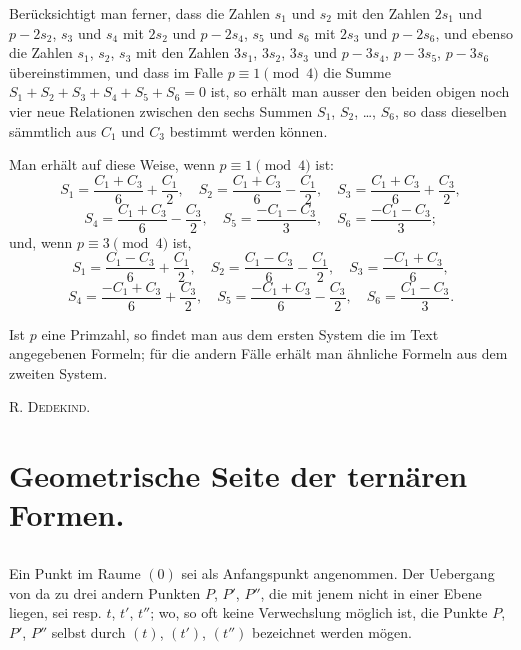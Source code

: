 \documentclass[12pt,a4paper]{article}
\begin{document}
Berücksichtigt man ferner, dass die Zahlen $s_1$ und $s_2$ mit den Zahlen $2s_1$ und $p - 2s_2$,
$s_3$ und $s_4$ mit $2s_2$ und $p - 2s_4$, $s_5$ und $s_6$ mit $2s_3$ und $p - 2s_6$,
und ebenso die Zahlen $s_1$, $s_2$, $s_3$ mit den Zahlen $3s_1$, $3s_2$, $3s_3$ und
$p - 3s_4$, $p - 3s_5$, $p - 3s_6$ übereinstimmen, und dass im Falle $p \equiv 1 \pmod{4}$
die Summe $S_1 + S_2 + S_3 + S_4 + S_5 + S_6 = 0$ ist, so erhält man ausser den beiden
obigen noch vier neue Relationen zwischen den sechs Summen $S_1$, $S_2$, \ldots{}, $S_6$,
so dass dieselben sämmtlich aus $C_1$ und $C_3$ bestimmt werden können.

Man erhält auf diese Weise, wenn $p \equiv 1 \pmod{4}$ ist:
\[
S_1 = \frac{C_1 + C_3}{6} + \frac{C_1}{2}, \quad S_2 = \frac{C_1 + C_3}{6} - \frac{C_1}{2}, \quad S_3 = \frac{C_1 + C_3}{6} + \frac{C_3}{2},
\]
\[
S_4 = \frac{C_1 + C_3}{6} - \frac{C_3}{2}, \quad S_5 = \frac{-C_1 - C_3}{3}, \quad S_6 = \frac{-C_1 - C_3}{3};
\]
und, wenn $p \equiv 3 \pmod{4}$ ist,
\[
S_1 = \frac{C_1 - C_3}{6} + \frac{C_1}{2}, \quad S_2 = \frac{C_1 - C_3}{6} - \frac{C_1}{2}, \quad S_3 = \frac{-C_1 + C_3}{6},
\]
\[
S_4 = \frac{-C_1 + C_3}{6} + \frac{C_3}{2}, \quad S_5 = \frac{-C_1 + C_3}{6} - \frac{C_3}{2}, \quad S_6 = \frac{C_1 - C_3}{3}.
\]

Ist $p$ eine Primzahl, so findet man aus dem ersten System die im Text angegebenen Formeln;
für die andern Fälle erhält man ähnliche Formeln aus dem zweiten System.

\begin{flushright}
\textsc{R. Dedekind.}
\end{flushright}

\newpage


\section*{Geometrische Seite der ternären Formen.}

\subsection*{}

Ein Punkt im Raume $(0)$ sei als Anfangspunkt angenommen. Der Uebergang von da zu drei
andern Punkten $P$, $P'$, $P''$, die mit jenem nicht in einer Ebene liegen, sei resp. $t$, $t'$, $t''$;
wo, so oft keine Verwechslung möglich ist, die Punkte $P$, $P'$, $P''$ selbst durch $(t)$, $(t')$, $(t'')$
bezeichnet werden mögen.
\end{document}
